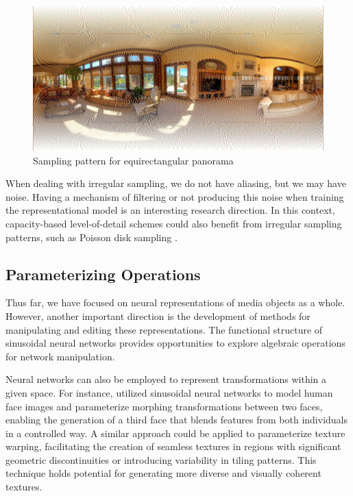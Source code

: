 \begin{figure}[!ht]
   \centering
   \includegraphics[width=0.80\linewidth]{img/ch7/sampling-pattern.jpeg}
   \caption{Sampling pattern for equirectangular panorama} 
   \label{f:inr-panorama}
\end{figure}


When dealing with irregular sampling, we do not have aliasing, but we may have noise. Having a mechanism of filtering or not producing this noise when training the representational model is an interesting research direction. In this context, capacity-based level-of-detail schemes could also benefit from irregular sampling patterns, such as Poisson disk sampling \citep{stochastic_cook}.

\subsection{Parameterizing Operations}


Thus far, we have focused on neural representations of media objects as a whole. However, another important direction is the development of methods for manipulating and editing these representations. The functional structure of sinusoidal neural networks provides opportunities to explore algebraic operations for network manipulation.


Neural networks can also be employed to represent transformations within a given space. For instance, \cite{schardong2024neural} utilized sinusoidal neural networks to model human face images and parameterize morphing transformations between two faces, enabling the generation of a third face that blends features from both individuals in a controlled way. A similar approach could be applied to parameterize texture warping, facilitating the creation of seamless textures in regions with significant geometric discontinuities or introducing variability in tiling patterns. This technique holds potential for generating more diverse and visually coherent textures.

